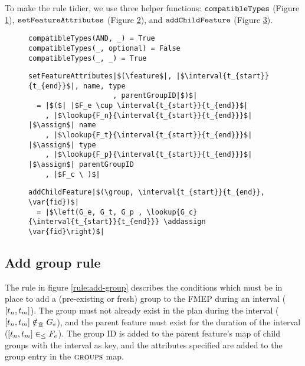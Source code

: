 To make the rule tidier, we use three helper functions: $\texttt{compatibleTypes}$ (Figure \ref{fun:compatible-types}), $\texttt{setFeatureAttributes}$ (Figure \ref{fun:set-feature-attributes}), and $\texttt{addChildFeature}$ (Figure \ref{fun:add-child-feature}). 

\begin{figure}
  \begin{verbatim}
compatibleTypes(AND, _) = True
compatibleTypes(_, optional) = False
compatibleTypes(_, _) = True
  \end{verbatim}
  \caption{\label{fun:compatible-types}}
\end{figure}

\begin{figure}
  \begin{verbatim}
setFeatureAttributes|$(\feature$|, |$\interval{t_{start}}{t_{end}}$|, name, type
                    , parentGroupID|$)$|
  = |$($| |$F_e \cup \interval{t_{start}}{t_{end}}$|
    , |$\lookup{F_n}{\interval{t_{start}}{t_{end}}}$| |$\assign$| name
    , |$\lookup{F_t}{\interval{t_{start}}{t_{end}}}$| |$\assign$| type
    , |$\lookup{F_p}{\interval{t_{start}}{t_{end}}}$| |$\assign$| parentGroupID
    , |$F_c \ )$|
   \end{verbatim}
  \caption{\label{fun:set-feature-attributes}}
\end{figure}

\begin{figure}
  \begin{verbatim}
addChildFeature|$(\group, \interval{t_{start}}{t_{end}}, \var{fid})$|
  = |$\left(G_e, G_t, G_p , \lookup{G_c}{\interval{t_{start}}{t_{end}}} \addassign \var{fid}\right)$|
  \end{verbatim}
  \caption{\label{fun:add-child-feature}}
\end{figure}

\subsection{Add group rule}
\label{sub:add-group-rule}
The rule in figure \ref{rule:add-group} describes the conditions which must be in place to add a (pre-existing or fresh) group to the FMEP during an interval ($\interval{t_n}{t_m}$). The group must not already exist in the plan during the interval ($\interval{t_n}{t_m} \notinnr G_e$), and the parent feature must exist for the duration of the interval ($\interval{t_n}{t_m} \inn F_e$). The group ID is added to the parent feature's map of child groups with the interval as key, and the attributes specified are added to the group entry in the $\textsc{groups}{}$ map.


